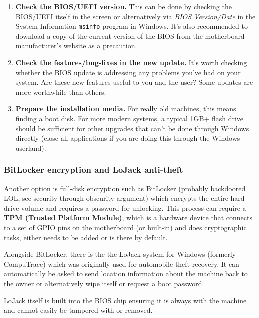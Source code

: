 \documentclass{article}
\begin{document}
\begin{enumerate}

\item \textbf{Check the BIOS/UEFI version.} This can be done by checking the BIOS/UEFI itself in the screen or alternatively via \textit{BIOS Version/Date} in the System Information \texttt{msinfo} program in Windows. It's also recommended to download a copy of the current version of the BIOS from the motherboard manufacturer's website as a precaution.

\item \textbf{Check the features/bug-fixes in the new update.} It's worth checking whether the BIOS update is addressing any problems you've had on your system. Are these new features useful to you and the user? Some updates are more worthwhile than others.

\item \textbf{Prepare the installation media.} For really old machines, this means finding a boot disk. For more modern systems, a typical 1GB+ flash drive should be sufficient for other upgrades that can't be done through Windows directly (close all applications if you are doing this through the Windows userland).

\end{enumerate}

\subsubsection{BitLocker encryption and LoJack anti-theft}

Another option is full-disk encryption such as BitLocker (probably backdoored LOL, see security through obscurity argument) which encrypts the entire hard drive volume and requires a password for unlocking. This process can require a \textbf{TPM (Trusted Platform Module)}, which is a hardware device that connects to a set of GPIO pins on the motherboard (or built-in) and does cryptographic tasks, either needs to be added or is there by default.

Alongside BitLocker, there is the the LoJack system for Windows (formerly CompuTrace) which was originally used for automobile theft recovery. It can automatically be asked to send location information about the machine back to the owner or alternatively wipe itself or request a boot password.

LoJack itself is built into the BIOS chip ensuring it is always with the machine and cannot easily be tampered with or removed.
\end{document}
